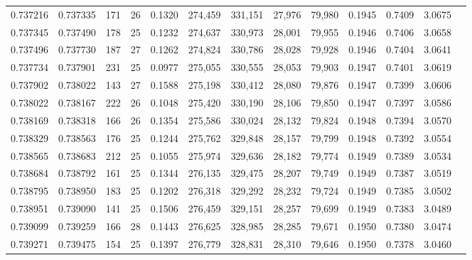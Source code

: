 \begin{tabular}{rrrrrrrrrrrrr}
0.737216 & 0.737335 &   171 &  26 &                                     0.1320 & 274,459 & 331,151 &  27,976 &  79,980 & 0.1945 & 0.7409 & 3.0675 \\
0.737345 & 0.737490 &   178 &  25 &                                     0.1232 & 274,637 & 330,973 &  28,001 &  79,955 & 0.1946 & 0.7406 & 3.0658 \\
0.737496 & 0.737730 &   187 &  27 &                                     0.1262 & 274,824 & 330,786 &  28,028 &  79,928 & 0.1946 & 0.7404 & 3.0641 \\
0.737734 & 0.737901 &   231 &  25 &                                     0.0977 & 275,055 & 330,555 &  28,053 &  79,903 & 0.1947 & 0.7401 & 3.0619 \\
0.737902 & 0.738022 &   143 &  27 &                                     0.1588 & 275,198 & 330,412 &  28,080 &  79,876 & 0.1947 & 0.7399 & 3.0606 \\
0.738022 & 0.738167 &   222 &  26 &                                     0.1048 & 275,420 & 330,190 &  28,106 &  79,850 & 0.1947 & 0.7397 & 3.0586 \\
0.738169 & 0.738318 &   166 &  26 &                                     0.1354 & 275,586 & 330,024 &  28,132 &  79,824 & 0.1948 & 0.7394 & 3.0570 \\
0.738329 & 0.738563 &   176 &  25 &                                     0.1244 & 275,762 & 329,848 &  28,157 &  79,799 & 0.1948 & 0.7392 & 3.0554 \\
0.738565 & 0.738683 &   212 &  25 &                                     0.1055 & 275,974 & 329,636 &  28,182 &  79,774 & 0.1949 & 0.7389 & 3.0534 \\
0.738684 & 0.738792 &   161 &  25 &                                     0.1344 & 276,135 & 329,475 &  28,207 &  79,749 & 0.1949 & 0.7387 & 3.0519 \\
0.738795 & 0.738950 &   183 &  25 &                                     0.1202 & 276,318 & 329,292 &  28,232 &  79,724 & 0.1949 & 0.7385 & 3.0502 \\
0.738951 & 0.739090 &   141 &  25 &                                     0.1506 & 276,459 & 329,151 &  28,257 &  79,699 & 0.1949 & 0.7383 & 3.0489 \\
0.739099 & 0.739259 &   166 &  28 &                                     0.1443 & 276,625 & 328,985 &  28,285 &  79,671 & 0.1950 & 0.7380 & 3.0474 \\
0.739271 & 0.739475 &   154 &  25 &                                     0.1397 & 276,779 & 328,831 &  28,310 &  79,646 & 0.1950 & 0.7378 & 3.0460 \\

\end{tabular}
